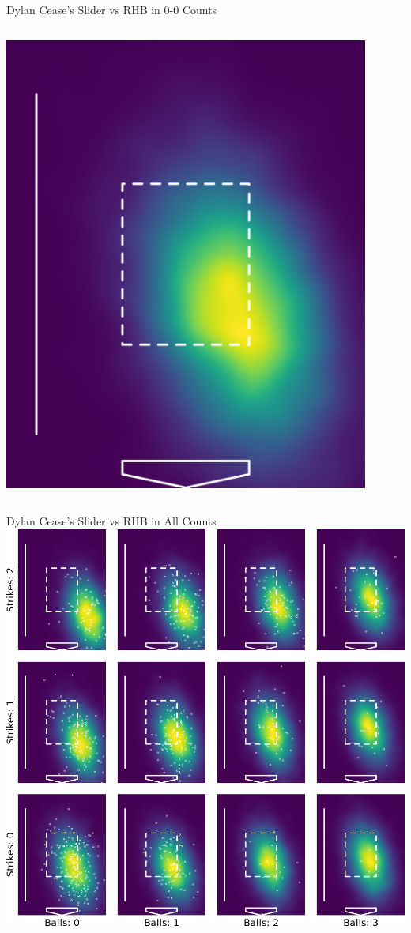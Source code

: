 \documentclass{beamer}
\begin{document}
\begin{frame}{Dylan Cease's Slider vs RHB in 0-0 Counts}
\begin{columns}
\begin{column}{0.5\textwidth}
        \includegraphics[width = 0.9\textwidth]{images/656302_SL_R_0_0_plate.png}
      \end{column}
    \end{columns}
  \end{frame}

  \begin{frame}{Dylan Cease's Slider vs RHB in All Counts}
    \vfill
    \centering
    \includegraphics[height = 0.85\textheight]{images/656302_SL_R_plate.png}
  \end{frame}
\end{document}
